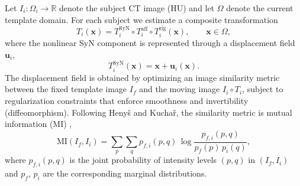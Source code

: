 Let $I_i:\Omega_i\rightarrow\mathbb{R}$ denote the subject CT image (HU) and let $\Omega$ denote the current template domain. For each subject we estimate a composite transformation
\begin{equation}
T_i(\mathbf{x}) = T_i^{\mathrm{SyN}}\circ T_i^{\mathrm{aff}}\circ T_i^{\mathrm{rig}}(\mathbf{x}),
\qquad \mathbf{x}\in\Omega,
\label{eq:composite_transform}
\end{equation}
where the nonlinear SyN component is represented through a displacement field $\mathbf{u}_i$,
\begin{equation}
T_i^{\mathrm{SyN}}(\mathbf{x}) = \mathbf{x} + \mathbf{u}_i(\mathbf{x}).
\label{eq:syn_displacement}
\end{equation}
The displacement field is obtained by optimizing an image similarity metric between the fixed template image $I_f$ and the moving image $I_i\circ T_i$, subject to regularization constraints that enforce smoothness and invertibility (diffeomorphism). Following Heny\v{s} and Kucha\v{r}, the similarity metric is mutual information (MI) \cite{Maes1997_MutualInformationRegistration},
\begin{equation}
\mathrm{MI}(I_f,I_i) = \sum_{p}\sum_{q} p_{f,i}(p,q)\,\log\frac{p_{f,i}(p,q)}{p_f(p)\,p_i(q)},
\label{eq:mutual_information}
\end{equation}
where $p_{f,i}(p,q)$ is the joint probability of intensity levels $(p,q)$ in $(I_f,I_i)$ and $p_f$, $p_i$ are the corresponding marginal distributions.

